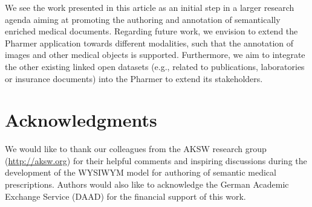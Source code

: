 \documentclass[journal]{IEEEtran}
\begin{document}
We see the work presented in this article as an initial step in a larger research agenda aiming at promoting the authoring and annotation of semantically enriched medical documents.
Regarding future work, we envision to extend the Pharmer application towards different modalities, such that the annotation of images and other medical objects is supported.
Furthermore, we aim to integrate the other existing linked open datasets (e.g., related to publications, laboratories or insurance documents) into the Pharmer to extend its stakeholders.

\section*{Acknowledgments}
We would like to thank our colleagues from the AKSW research group (\url{http://aksw.org}) for their helpful comments and inspiring discussions during the development of the WYSIWYM model for authoring of semantic medical prescriptions.
Authors would also like to acknowledge the German Academic Exchange Service (DAAD) for the financial support of this work.



\end{document}
